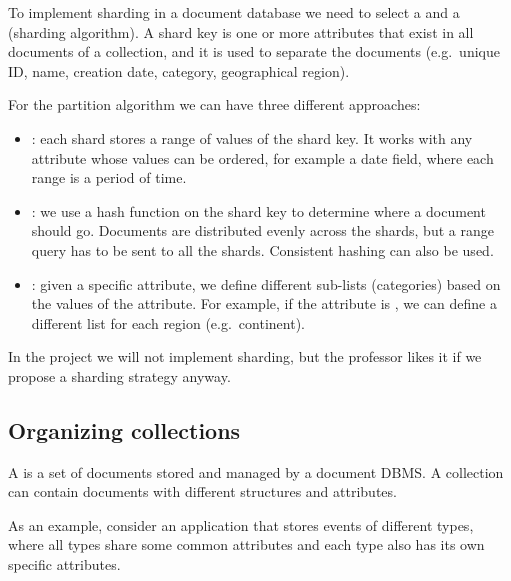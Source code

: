 To implement sharding in a document database we need to select a  and a  (sharding algorithm). A shard key is one or more attributes that exist in all documents of a collection, and it is used to separate the documents (e.g.\ unique ID, name, creation date, category, geographical region).

For the partition algorithm we can have three different approaches:
\begin{itemize}
  \item {}: each shard stores a range of values of the shard key. It works with any attribute whose values can be ordered, for example a date field, where each range is a period of time.
  \item {}: we use a hash function on the shard key to determine where a document should go. Documents are distributed evenly across the shards, but a range query has to be sent to all the shards. Consistent hashing can also be used.
  \item {}: given a specific attribute, we define different sub-lists (categories) based on the values of the attribute. For example, if the attribute is , we can define a different list for each region (e.g.\ continent).
\end{itemize}

In the project we will not implement sharding, but the professor likes it if we propose a sharding strategy anyway.

\subsection{Organizing collections}

A  is a set of documents stored and managed by a document DBMS. A collection can contain documents with different structures and attributes.

As an example, consider an application that stores events of different types, where all types share some common attributes and each type also has its own specific attributes.

